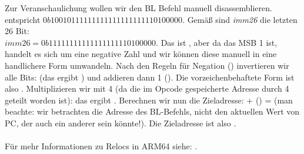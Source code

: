 Zur Veranschaulichung wollen wir den BL Befehl manuell disassemblieren.\\
 entspricht $0b10010111111111111111111110100000$.
Gemäß  sind \emph{imm26} die letzten 26 Bit:\\
$imm26 = 0b11111111111111111110100000$.
Das ist , aber da das MSB 1 ist, handelt es sich um eine negative Zahl und wir können diese manuell in
eine handlichere Form umwandeln.
Nach den Regeln für Negation () invertieren wir alle Bits: (das ergibt
) und addieren dann 1 ().
Die vorzeichenbehaftete Form ist also .
Multiplizieren wir  mit 4 (da die im Opcode gespeicherte Adresse durch 4 geteilt worden ist): das ergibt
. 
Berechnen wir nun die Zieladresse:  + () =  (man beachte: wir betrachten die
Adresse des BL-Befehls, nicht den aktuellen Wert von \ac{PC}, der auch ein anderer sein könnte!).
Die Zieladresse ist also .\\\\
Für mehr Informationen zu Relocs in ARM64 siehe: \ARMELF.
